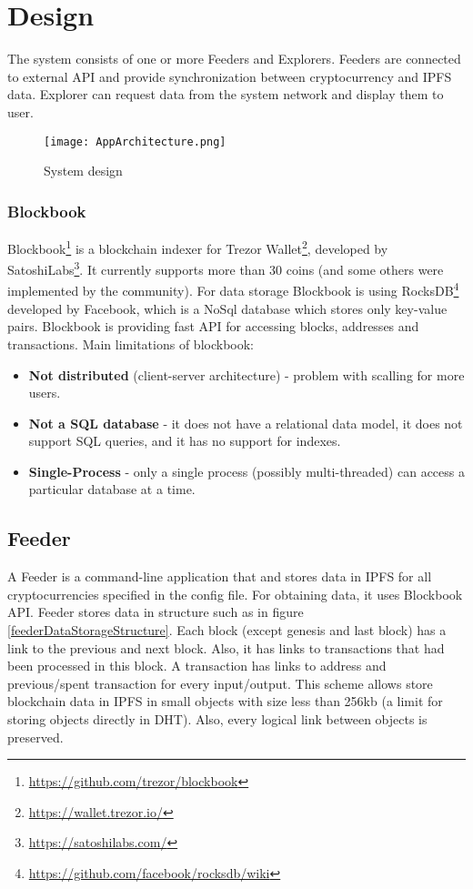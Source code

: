 \chapter{Design}

The system consists of one or more Feeders and Explorers. Feeders are connected to external API and provide synchronization between cryptocurrency and IPFS data. Explorer can request data from the system network and display them to user.

\begin{figure}[h]
    \centering
    \texttt{[image: AppArchitecture.png]}
    \caption{System design}
    \label{}
\end{figure}

\subsection{Blockbook}
Blockbook\footnote{\url{https://github.com/trezor/blockbook}} is a blockchain indexer for Trezor Wallet\footnote{\url{https://wallet.trezor.io/}}, developed by SatoshiLabs\footnote{\url{https://satoshilabs.com/}}. It currently supports more than 30 coins (and some others were implemented by the community). For data storage Blockbook is using RocksDB\footnote{\url{https://github.com/facebook/rocksdb/wiki}} developed by Facebook, which is a NoSql database which stores only key-value pairs. Blockbook is providing fast API for accessing blocks, addresses and transactions. Main limitations of blockbook:
\begin{itemize}
    \item \textbf{Not distributed} (client-server architecture) - problem with scalling for more users. 
    \item \textbf{Not a SQL database} - it does not have a relational data model, it does not support SQL queries, and it has no support for indexes.
    \item \textbf{Single-Process} - only a single process (possibly multi-threaded) can access a particular database at a time.
\end{itemize}

\section{Feeder}
A Feeder is a command-line application that and stores data in IPFS for all cryptocurrencies specified in the config file. For obtaining data, it uses Blockbook API. Feeder stores data in structure such as in figure \ref{feederDataStorageStructure}. Each block (except genesis and last block) has a link to the previous and next block. Also, it has links to transactions that had been processed in this block. A transaction has links to address and previous/spent transaction for every input/output. This scheme allows store blockchain data in IPFS in small objects with size less than 256kb (a limit for storing objects directly in DHT). Also, every logical link between objects is preserved. 

